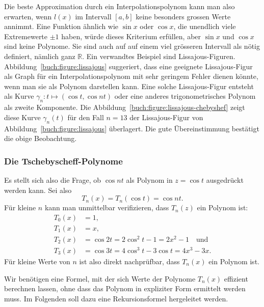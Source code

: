 Die beste Approximation durch ein Interpolationspolynom kann man also
erwarten, wenn $l(x)$ im Intervall $[a,b]$ keine besonders grossen Werte
annimmt.
%
Eine Funktion ähnlich wie $\sin x$ oder $\cos x$, die unendlich viele
Extremewerte $\pm 1$ haben, würde dieses Kriterium erfüllen, aber
$\sin x$ und $\cos x$ sind keine Polynome.
Sie sind auch auf auf einem viel grösseren Intervall als nötig definiert,
nämlich ganz $\mathbb R$.
Ein verwandtes Beispiel sind Lissajous-Figuren.
%
Abbildung~\ref{buch:figure:lissajous} suggeriert, dass eine geeignete
Lissajous-Figur als Graph für ein Interpolationspolynom mit sehr
geringem Fehler dienen könnte, wenn man sie als Polynom darstellen kann.
Eine solche Lissajous-Figur entsteht als Kurve
$\gamma_n\colon t\mapsto (\cos t, \cos nt)$ oder eine anderes trigonometrisches
Polynom als zweite Komponente.
%
%
Die Abbildung~\ref{buch:figure:lissajous-chebyshef} zeigt diese Kurve
$\gamma_n(t)$
für den Fall $n=13$ der Lissajous-Figur von
Abbildung~\ref{buch:figure:lissajous} überlagert.
Die gute Übereinstimmung bestätigt die obige Beobachtung.

\subsubsection{Die Tschebyscheff-Polynome}
Es stellt sich also die Frage, ob $\cos nt$ als Polynom in $z=\cos t$
ausgedrückt werden kann.
Sei also
\[
T_n(x)
=
T_n(\cos t)
= 
\cos nt.
\]
Für kleine $n$ kann man unmittelbar verifizieren, dass $T_n(z)$ ein
Polynom ist:
\begin{equation}
\begin{aligned}
T_0(x) &= 1,\\
T_1(x) &= x,\\
T_2(x) &= \cos 2t = 2\cos^2 t-1 = 2x^2 -1
\quad\text{und}
\\
T_3(x) &= \cos 3t = 4\cos^3 t - 3\cos t = 4x^3-3x.
\end{aligned}
\label{buch:tschebyscheff:erste}
\end{equation}
Für kleine Werte von $n$ ist also direkt nachprüfbar, dass $T_n(x)$
ein Polynom ist.

Wir benötigen eine Formel, mit der sich Werte der Polynome $T_n(x)$
effizient berechnen lassen, ohne dass das Polynom in expliziter
Form ermittelt werden muss.
Im Folgenden soll dazu eine Rekursionsformel hergeleitet werden.
%

